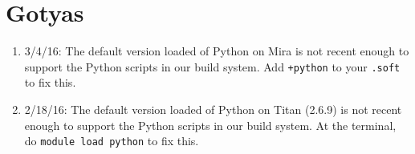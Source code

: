 \section{Gotyas}

\begin{enumerate}

\item 3/4/16: The default version loaded of Python on Mira is not
  recent enough to support the Python scripts in our build system. Add
  {\tt +python} to your {\tt .soft} to fix this.

\item 2/18/16: The default version loaded of Python on Titan (2.6.9)
  is not recent enough to support the Python scripts in our build
  system. At the terminal, do {\tt module load python} to fix this.


\end{enumerate}

